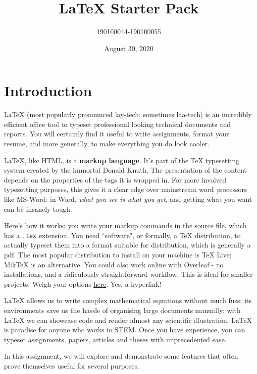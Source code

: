 \documentclass[a4paper]{article}
\title{\LaTeX{} Starter Pack}
\author{190100044-190100055}
\date{August 30, 2020}
\begin{document}
\maketitle
\tableofcontents
\thispagestyle{empty}

\newpage \setcounter{page}{1}
\section{Introduction}
\LaTeX{} (most popularly pronounced lay-tech; sometimes laa-tech) is an incredibly efficient office tool to typeset professional looking technical documents and reports. You will certainly find it useful to write assignments, format your resume, and more generally, to make everything you do look cooler. \par\medskip
\LaTeX{}, like HTML, is a \textbf{markup language}. It's part of the \TeX{} typesetting system created by the immortal Donald Knuth. The presentation of the content depends on the properties of the tags it is wrapped in. For more involved typesetting purposes, this gives it a clear edge over mainstream word processors like \textcolor[HTML]{001a33}{MS-Word}: in Word, \textit{what you see is what you get}, and getting what you want can be insanely tough. \par\medskip
Here's how it works: you write your markup commands in the source file, which has a \verb!.tex! extension. You need ``software", or formally, a \TeX{} distribution, to actually typeset them into a format suitable for distribution, which is generally a pdf. The most popular distribution to install on your machine is TeX Live; MikTeX is an alternative. You could also work online with Overleaf - no installations, and a ridiculously straightforward workflow. This is ideal for smaller projects. Weigh your options \href{https://www.latex-project.org/get/}{here}. Yes, a hyperlink! \par\medskip
\LaTeX{} allows us to write complex mathematical equations without much fuss; its environments save us the hassle of organising large documents manually; with \LaTeX{} we can showcase code and render almost any scientific illustration. \LaTeX{} is paradise for anyone who works in STEM. Once you have experience, you can typeset assignments, papers, articles and theses with unprecedented ease. \par\medskip
In this assignment, we will explore and demonstrate some features that often prove themselves useful for several purposes. \par\medskip
\onehalfspacing
\end{document}
